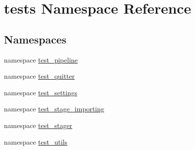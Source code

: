 \hypertarget{namespacetests}{\section{tests \-Namespace \-Reference}
\label{namespacetests}
}
\subsection*{\-Namespaces}
\begin{DoxyCompactItemize}
\item 
namespace \hyperlink{namespacetests_1_1test__pipeline}{test\-\_\-pipeline}
\item 
namespace \hyperlink{namespacetests_1_1test__quitter}{test\-\_\-quitter}
\item 
namespace \hyperlink{namespacetests_1_1test__settings}{test\-\_\-settings}
\item 
namespace \hyperlink{namespacetests_1_1test__stage__importing}{test\-\_\-stage\-\_\-importing}
\item 
namespace \hyperlink{namespacetests_1_1test__stager}{test\-\_\-stager}
\item 
namespace \hyperlink{namespacetests_1_1test__utils}{test\-\_\-utils}
\end{DoxyCompactItemize}
